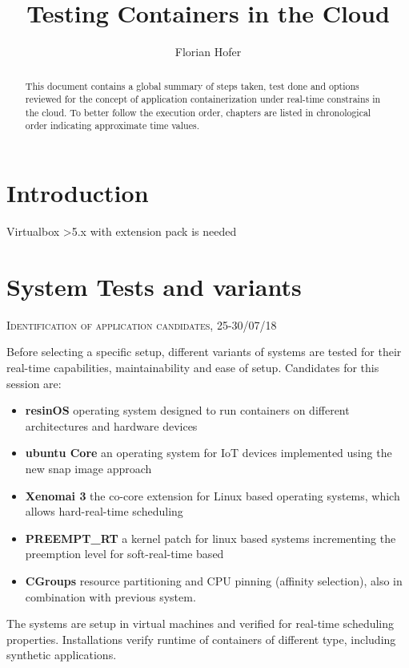 \documentclass[]{scrartcl}
\title{Testing Containers in the Cloud}
\author{Florian Hofer}
\date{}
\begin{document}
\maketitle

\begin{abstract}
	This document contains a global summary of steps taken, test done and options reviewed for the concept of application containerization under real-time constrains in the cloud. To better follow the execution order, chapters are listed in chronological order indicating approximate time values.
\end{abstract}

\section{Introduction}



Virtualbox >5.x with extension pack is needed

\section{System Tests and variants}

{\small\textsc{Identification of application candidates, 25-30/07/18} \bigskip}

Before selecting a specific setup, different variants of systems are tested for their real-time capabilities, maintainability and ease of setup. Candidates for this session are:

\begin{itemize}
	\item \textbf{resinOS} operating system designed to run containers on different architectures and hardware devices
	\item \textbf{ubuntu Core} an operating system for IoT devices implemented using the new snap image approach
	\item \textbf{Xenomai 3} the co-core extension for Linux based operating systems, which allows hard-real-time scheduling
	\item \textbf{PREEMPT\_RT} a kernel patch for linux based systems incrementing the preemption level for soft-real-time based
	\item \textbf{CGroups} resource partitioning and CPU pinning (affinity selection), also in combination with previous system.
\end{itemize}

The systems are setup in virtual machines and verified for real-time scheduling properties. Installations verify runtime of containers of different type, including synthetic applications.
\end{document}
